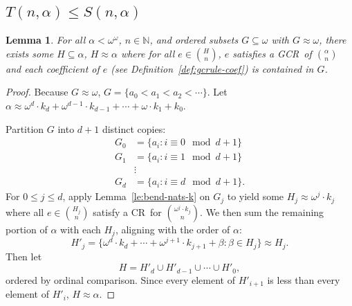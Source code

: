 \documentclass[11pt]{article}
\newcommand{\om}{\omega}
\newcommand{\oequiv}{\approx}
\newcommand{\N}{\mathbb{N}}
\newcommand{\crulenospace}{CR}
\newcommand{\crule}{\crulenospace~}
\newcommand{\gencrulenospace}{GCR}
\newcommand{\gencrule}{\gencrulenospace~}
\newcommand{\numpoints}{n}
\newcommand{\idegr}{j}
\newcommand{\commonconst}{a}
\theoremstyle{plain}
\newtheorem{lemma}[theorem]{Lemma}
\theoremstyle{definition}
\begin{document}
\subsection{\texorpdfstring{$T(\numpoints,\alpha)\leq S(\numpoints,\alpha)$}{T(\numpoints, alpha) <= S(\numpoints, alpha)}}
\begin{lemma}
\label{le:bend-nats-alph}
For all $\alpha < \om^\om$, $\numpoints \in \N$, and ordered subsets
$G \subseteq \om$ with $G \oequiv \om$, there exists some $H \subseteq \alpha$, $H \oequiv \alpha$ where for all $e \in \binom{H}{\numpoints}$, $e$ satisfies a \gencrule of $\binom{\alpha}{\numpoints}$ and each coefficient of $e$ (see Definition~\ref{def:gcrule-coef}) is contained in $G$.
\end{lemma}
\begin{proof}
Because $G \oequiv \om$, $G = \{\commonconst_0 < \commonconst_1 < \commonconst_2 <
\cdots\}$.
Let $\alpha \oequiv \om^d \cdot k_d + \om^{d-1} \cdot k_{d-1} + \cdots + \om \cdot k_1 + k_0$.

Partition $G$ into $d+1$ distinct copies: \begin{align*}
    G_0 &= \{a_i : i \equiv 0 \mod d+1\}\\
    G_1 &= \{a_i : i \equiv 1 \mod d+1\}\\
    &\vdots\\
    G_{d} &= \{a_i : i \equiv d \mod d+1\}.
\end{align*}
For $0 \leq \idegr \leq d$, apply Lemma~\ref{le:bend-nats-k} on $G_\idegr$ to yield some $H_\idegr \oequiv \om^{\idegr} \cdot k_{\idegr}$ where all $e \in \binom{H_{\idegr}}{n}$ satisfy a \crule for $\binom{\om^{\idegr} \cdot k_{\idegr}}{\numpoints}$.
We then sum the remaining portion of $\alpha$ with each $H_j$, aligning with the order of $\alpha$:
$$
H'_j = \{\om^d \cdot k_d + \cdots + \om^{j+1} \cdot k_{j+1} + \beta : \beta \in H_j\} \oequiv H_j.
$$
Then let
$$H = H'_d \cup H'_{d-1} \cup \cdots \cup H'_0,$$
ordered by ordinal comparison. Since every element of $H'_{i+1}$ is less than every element of $H'_i$, $H \oequiv \alpha$.




\end{proof}
\end{document}
